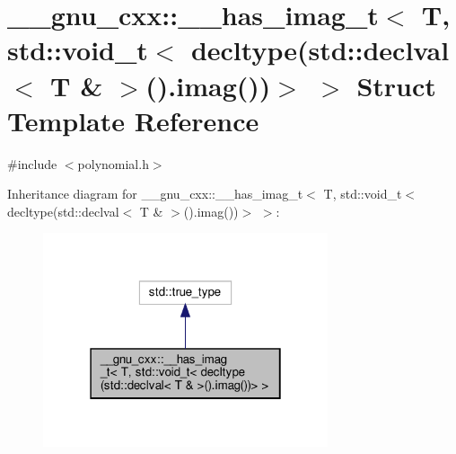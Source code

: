 \hypertarget{struct____gnu__cxx_1_1____has__imag__t_3_01T_00_01std_1_1void__t_3_01decltype_07std_1_1declval_389ee8aaba7dec2e199e7ad81d6cda763}{}\section{\+\_\+\+\_\+gnu\+\_\+cxx\+:\+:\+\_\+\+\_\+has\+\_\+imag\+\_\+t$<$ T, std\+:\+:void\+\_\+t$<$ decltype(std\+:\+:declval$<$ T \& $>$().imag())$>$ $>$ Struct Template Reference}
\label{struct____gnu__cxx_1_1____has__imag__t_3_01T_00_01std_1_1void__t_3_01decltype_07std_1_1declval_389ee8aaba7dec2e199e7ad81d6cda763}


{\ttfamily \#include $<$polynomial.\+h$>$}



Inheritance diagram for \+\_\+\+\_\+gnu\+\_\+cxx\+:\+:\+\_\+\+\_\+has\+\_\+imag\+\_\+t$<$ T, std\+:\+:void\+\_\+t$<$ decltype(std\+:\+:declval$<$ T \& $>$().imag())$>$ $>$\+:
\nopagebreak
\begin{figure}[H]
\begin{center}
\leavevmode
\includegraphics[width=238pt]{struct____gnu__cxx_1_1____has__imag__t_3_01T_00_01std_1_1void__t_3_01decltype_07std_1_1declval_3f9e8e0da80d34a132b8da0cdc144eae1}
\end{center}
\end{figure}


